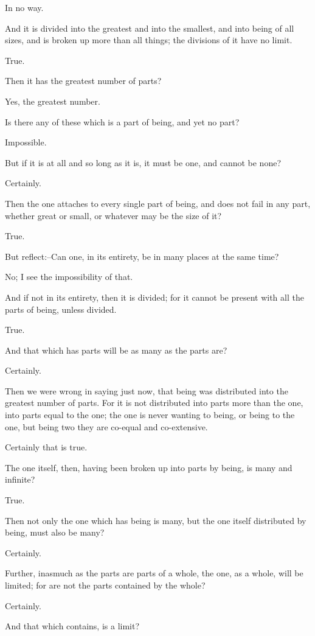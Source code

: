 In no way.

And it is divided into the greatest and into the smallest, and into
being of all sizes, and is broken up more than all things; the divisions
of it have no limit.

True.

Then it has the greatest number of parts?

Yes, the greatest number.

Is there any of these which is a part of being, and yet no part?

Impossible.

But if it is at all and so long as it is, it must be one, and cannot be
none?

Certainly.

Then the one attaches to every single part of being, and does not fail
in any part, whether great or small, or whatever may be the size of it?

True.

But reflect:--Can one, in its entirety, be in many places at the same
time?

No; I see the impossibility of that.

And if not in its entirety, then it is divided; for it cannot be present
with all the parts of being, unless divided.

True.

And that which has parts will be as many as the parts are?

Certainly.

Then we were wrong in saying just now, that being was distributed into
the greatest number of parts. For it is not distributed into parts more
than the one, into parts equal to the one; the one is never wanting
to being, or being to the one, but being two they are co-equal and
co-extensive.

Certainly that is true.

The one itself, then, having been broken up into parts by being, is many
and infinite?

True.

Then not only the one which has being is many, but the one itself
distributed by being, must also be many?

Certainly.

Further, inasmuch as the parts are parts of a whole, the one, as a
whole, will be limited; for are not the parts contained by the whole?

Certainly.

And that which contains, is a limit?

